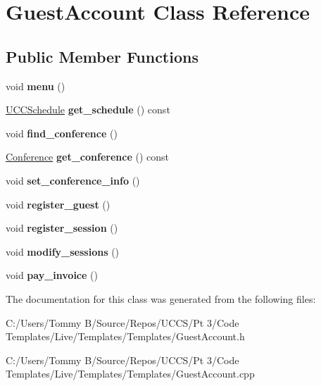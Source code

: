 \hypertarget{class_guest_account}{}\section{Guest\+Account Class Reference}
\label{class_guest_account}
\subsection*{Public Member Functions}
\begin{DoxyCompactItemize}
\item 
\mbox{\label{class_guest_account_abe433e1123fc6d762c0bca54518d199a}} 
void {\bfseries menu} ()
\item 
\mbox{\label{class_guest_account_a5c1302608d34261881d2b02a48ddafa9}} 
\hyperlink{class_u_c_c_schedule}{U\+C\+C\+Schedule} {\bfseries get\+\_\+schedule} () const
\item 
\mbox{\label{class_guest_account_af266900055fc43ab94462f8dd3e083ac}} 
void {\bfseries find\+\_\+conference} ()
\item 
\mbox{\label{class_guest_account_affffc64177e9833403d2bebadfca3656}} 
\hyperlink{class_conference}{Conference} {\bfseries get\+\_\+conference} () const
\item 
\mbox{\label{class_guest_account_a1203300de0cf960e29eec88ee9098686}} 
void {\bfseries set\+\_\+conference\+\_\+info} ()
\item 
\mbox{\label{class_guest_account_afb849267314653cf3d2f3e6eb0ec8930}} 
void {\bfseries register\+\_\+guest} ()
\item 
\mbox{\label{class_guest_account_a84e19d8ff02a1ecdb9e25b5d8b373018}} 
void {\bfseries register\+\_\+session} ()
\item 
\mbox{\label{class_guest_account_a397df59ffa03ef48564951fbf714fe31}} 
void {\bfseries modify\+\_\+sessions} ()
\item 
\mbox{\label{class_guest_account_a34e029bd37af266012cd131a6dfa8fc5}} 
void {\bfseries pay\+\_\+invoice} ()
\end{DoxyCompactItemize}


The documentation for this class was generated from the following files\+:\begin{DoxyCompactItemize}
\item 
C\+:/\+Users/\+Tommy B/\+Source/\+Repos/\+U\+C\+C\+S/\+Pt 3/\+Code Templates/\+Live/\+Templates/\+Templates/Guest\+Account.\+h\item 
C\+:/\+Users/\+Tommy B/\+Source/\+Repos/\+U\+C\+C\+S/\+Pt 3/\+Code Templates/\+Live/\+Templates/\+Templates/Guest\+Account.\+cpp\end{DoxyCompactItemize}
